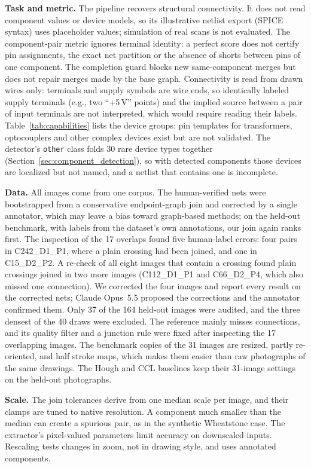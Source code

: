 \documentclass[journal]{IEEEtran}
\begin{document}
\textbf{Task and metric.} The pipeline recovers structural connectivity. It does not read component values or device models, so its illustrative netlist export (SPICE syntax) uses placeholder values; simulation of real scans is not evaluated. The component-pair metric ignores terminal identity: a perfect score does not certify pin assignments, the exact net partition or the absence of shorts between pins of one component. The completion guard blocks new same-component merges but does not repair merges made by the base graph. Connectivity is read from drawn wires only: terminals and supply symbols are wire ends, so identically labeled supply terminals (e.g., two ``+5\,V'' points) and the implied source between a pair of input terminals are not interpreted, which would require reading their labels. Table~\ref{tab:capabilities} lists the device groups: pin templates for transformers, optocouplers and other complex devices exist but are not validated. The detector's \texttt{other} class folds 30 rare device types together (Section~\ref{sec:component_detection}), so with detected components those devices are localized but not named, and a netlist that contains one is incomplete.

\textbf{Data.} All images come from one corpus. The human-verified nets were bootstrapped from a conservative endpoint-graph join and corrected by a single annotator, which may leave a bias toward graph-based methods; on the held-out benchmark, with labels from the dataset's own annotations, our join again ranks first. The inspection of the 17 overlaps found five human-label errors: four pairs in C242\_D1\_P1, where a plain crossing had been joined, and one in C15\_D2\_P2. A re-check of all eight images that contain a crossing found plain crossings joined in two more images (C112\_D1\_P1 and C66\_D2\_P4, which also missed one connection). We corrected the four images and report every result on the corrected nets; Claude Opus~5.5 proposed the corrections and the annotator confirmed them. Only 37 of the 164 held-out images were audited, and the three densest of the 40 draws were excluded. The reference mainly misses connections, and its quality filter and a junction rule were fixed after inspecting the 17 overlapping images. The benchmark copies of the 31 images are resized, partly re-oriented, and half stroke maps, which makes them easier than raw photographs of the same drawings. The Hough and CCL baselines keep their 31-image settings on the held-out photographs.

\textbf{Scale.} The join tolerances derive from one median scale per image, and their clamps are tuned to native resolution. A component much smaller than the median can create a spurious pair, as in the synthetic Wheatstone case. The extractor's pixel-valued parameters limit accuracy on downscaled inputs. Rescaling tests changes in zoom, not in drawing style, and uses annotated components.
\end{document}
